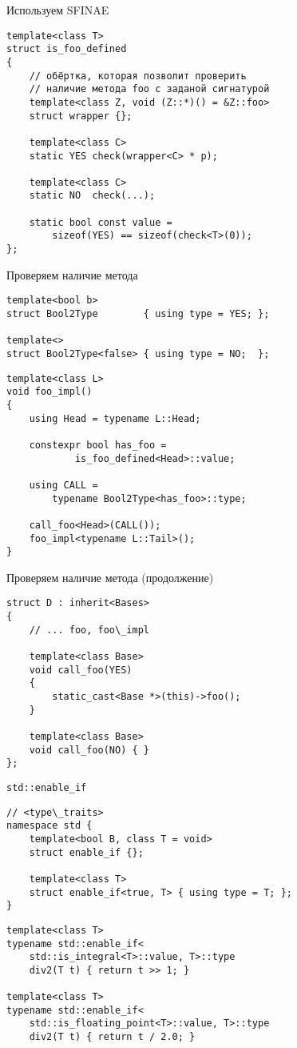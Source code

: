 \documentclass{beamer}
\begin{document}
\begin{frame}[fragile]{Используем SFINAE}
\begin{lstlisting}
template<class T>
struct is_foo_defined
{
    // обёртка, которая позволит проверить
    // наличие метода foo с заданой сигнатурой
    template<class Z, void (Z::*)() = &Z::foo>
    struct wrapper {};

    template<class C>
    static YES check(wrapper<C> * p);

    template<class C>
    static NO  check(...);

    static bool const value = 
        sizeof(YES) == sizeof(check<T>(0));
};
\end{lstlisting}
\end{frame}

\begin{frame}[fragile]{Проверяем наличие метода}
\begin{lstlisting}
template<bool b> 
struct Bool2Type        { using type = YES; };

template<> 
struct Bool2Type<false> { using type = NO;  };
\end{lstlisting}

\begin{lstlisting}
template<class L> 
void foo_impl() 
{
    using Head = typename L::Head;
    
    constexpr bool has_foo = 
            is_foo_defined<Head>::value;
    
    using CALL = 
        typename Bool2Type<has_foo>::type;
    
    call_foo<Head>(CALL());
    foo_impl<typename L::Tail>();
}
\end{lstlisting}
\end{frame}

\begin{frame}[fragile]{Проверяем наличие метода (продолжение)}
\begin{lstlisting}
struct D : inherit<Bases> 
{
    // ... foo, foo\_impl

    template<class Base>
    void call_foo(YES) 
    { 
        static_cast<Base *>(this)->foo();
    }

    template<class Base>
    void call_foo(NO) { }
};

\end{lstlisting}
\end{frame}

\begin{frame}[fragile]{{\tt std::enable\_if}}
\begin{lstlisting}
// <type\_traits>
namespace std {
    template<bool B, class T = void> 
    struct enable_if {};
 
    template<class T>
    struct enable_if<true, T> { using type = T; };
}
\end{lstlisting}
\begin{lstlisting}
template<class T>
typename std::enable_if<
    std::is_integral<T>::value, T>::type
    div2(T t) { return t >> 1; }
 
template<class T>
typename std::enable_if<
    std::is_floating_point<T>::value, T>::type
    div2(T t) { return t / 2.0; }
\end{lstlisting}
\end{frame}
\end{document}
